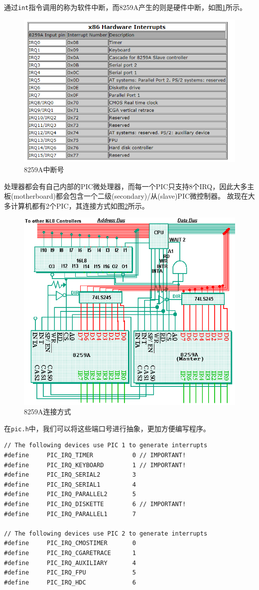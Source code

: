 \documentclass[logo,reportComp]{thesis}
\begin{document}
通过\verb'int'指令调用的称为软件中断，而8259A产生的则是硬件中断，如图\ref{fig:hardware_interrupt}所示。
\begin{figure}[H]
\centering
\includegraphics[width=0.8\linewidth]{fig/hardware_interrupt.PNG}
\caption{8259A中断号}
\label{fig:hardware_interrupt}
\end{figure}

处理器都会有自己内部的PIC微处理器，而每一个PIC只支持8个IRQ，因此大多主板(motherboard)都会包含一个二级(secondary)/从(slave)PIC微控制器。
故现在大多计算机都有2个PIC，其连接方式如图\ref{fig:8259A}所示。
\begin{figure}[H]
\centering
\includegraphics[width=0.6\linewidth]{fig/8259A.png}
\caption{8259A连接方式}
\label{fig:8259A}
\end{figure}

在\verb'pic.h'中，我们可以将这些端口号进行抽象，更加方便编写程序。
\begin{lstlisting}
// The following devices use PIC 1 to generate interrupts
#define		PIC_IRQ_TIMER			0 // IMPORTANT!
#define		PIC_IRQ_KEYBOARD		1 // IMPORTANT!
#define		PIC_IRQ_SERIAL2			3
#define		PIC_IRQ_SERIAL1			4
#define		PIC_IRQ_PARALLEL2		5
#define		PIC_IRQ_DISKETTE		6 // IMPORTANT!
#define		PIC_IRQ_PARALLEL1		7

// The following devices use PIC 2 to generate interrupts
#define		PIC_IRQ_CMOSTIMER		0
#define		PIC_IRQ_CGARETRACE		1
#define		PIC_IRQ_AUXILIARY		4
#define		PIC_IRQ_FPU				5
#define		PIC_IRQ_HDC				6
\end{lstlisting}
\end{document}
